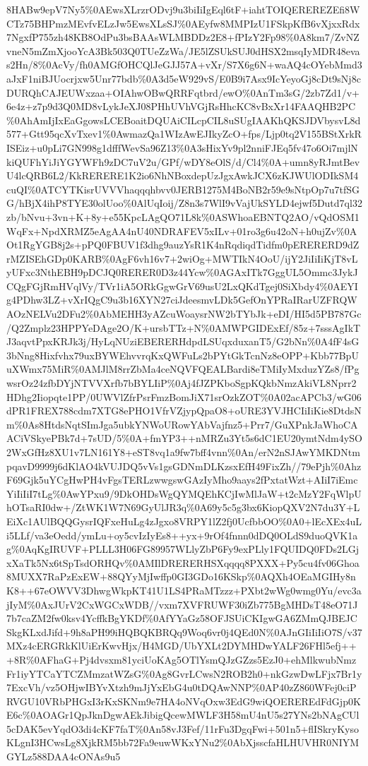 \documentclass[]{article}
\begin{document}
8HABw9epV7Ny5\%0AEwsXLrzrODvj9u3biIiIgEql6tF+iahtTOIQEREREZEfi8WCTz75BHPmzMEvfvELzJw5EwsXLsSJ\%0AEyfw8MMPIzU1FSkpKfB6vXjxxRdx7NgxfP755zh48KB8OdPu3bsBAAsWLMBDDz2E8+fPIzY2Fp98\%0A8km7/ZvNZvneN5mZmXjooYcA3Bk503Q0TUeZzWa/JE5lZSUkSUJ0dHSX2msqIyMDR48evas2Hn/8\%0AcVy/fh0AMGfOHCQlJeGJJ57A+vXr/S7X6g6N+waAQ4cOYebMmd3aJxF1niBJUocrjxw5Unr77bdb\%0A3d5eW929vS/E0B9i7Asx9IcYeyoGj8cDt9sNj8cDURQhCAJEUWxzaa+OIAhwOBwQRRFqtbrd/ewO\%0AnTm3sG/2zb7Zd1/v+6e4z+z7p9d3Q0MD8vLykJeXJ08PHhUVhVGjRsHhcKC8vBxXr14FAAQHB2PC\%0AhAmIjIxEaGgowsLCEBoaitDQUAiCILcpCIL8uSUgIAAKhQKSJDVbysvL8d577+Gtt95qcXvTxev1\%0AwmazQa1WIzAwEJIkyZcO+fps/Ljp0tq2V155BStXrkRISEiz+u0pLi7GN998g1dfffWevSa96Z13\%0A3sHixYv9pl2nniFJEq5fv47o6Oi7mjlNkiQUFhYiJiYGYWFh9zDC7uV2u/GPf/wDY8eOlS/d/Cl4\%0A+umn8yRJmtBevU4lcQRB6L2/KkRERERE1K2io6NhNBoxdepUzJgxAwkJCX6zKJWUlODIkSM4cuQI\%0ATCYTKisrUVVVhaqqqhbvv0JERB1275M4BoNB2r59e9sNtpOp7u7tfSGG/hBjX4ihP8TYE30olUoo\%0AlUqIoij/Z8n3s7WlI9vVajUkSYLD4ejwf5Dutd7ql32zb/bNvu+3vn+K+8y+e55KpcLAgQO71L8k\%0ASWhoaEBNTQ2AO/vQdOSM1WqFx+NpdXRMZ5eAgAA4nU40NDRAFEV5xILv+01ro3g6u42oN+h0ujZv\%0AOt1RgYGB8j2s+pPQ0FBUV1f3dhg9auzYsR1K4nRqdiqdTidfm0pERERERD9dZrMZISEhGDp0KARB\%0AgF6vh16v7+2wiOg+MWTIkN4OoU/ijY2JiIiIiKjT8vLyUFxc3NthEBH9pDCJQ0RERER0D3z44Ycw\%0AGAxITk7GggUL5Ommc3JykJCQgFGjRmHVqlVy/TVr1iA5ORkGgwGrV69usU2LxQKdTgej0SiXbdy4\%0AEYIg4PDhw3LZ+vXrIQgC9u3b16XYN27ciJdeesmvLDk5GefOnYPRaIRarUZFRQWAOzNELVu2DFu2\%0AbMEHH3yAZcuWoaysrNW2bTYbJk+eDI/HI5d5PB787Gc/Q2Zmplz23HPPYeDAge2O/K+ursbTTz+N\%0AMWPGIDExEf/85z+7sssAgIkTJ3aqvtPpxKRJk3j/HyLqNUziEBERERHdpdLSUqxduxanT5/G2bNn\%0A4fF4sG3bNng8Hixfvhx79uxBYWEhvvrqKxQWFuLs2bPYtGkTcnNz8eOPP+Kbb77BpUuXWmx75MiR\%0AMJlM8rrZbMa4ceNQVFQEALBardi8eTMiIyMxduzYZs8/fPgwsrOz24zfbDYjNTVVXrfb7bBYLIiP\%0Aj4fJZPKboSgpKQkbNmzAkiVL8Nprr2HDhg2Iiopqte1PP/0UWVlZfrPsrFmzBomJiX71srOzkZOT\%0A02acAPCb3/wG06dPR1FREX788cdm7XTG8ePHO1VfrVZjypQpaO8+oURE3YVJHCIiIiKie8DtdsNm\%0As8HtdsNqtSImJga5ubkYNWoURowYAbVajfnz5+Prr7/GuXPnkJaWhoCAACiVSkyePBk7d+7sUD/5\%0A+fmYP3++nMRZu3Yt5s6dC1EU20ymtNdm4ySO2WxGfHz8XU1v7LN161Y8+eST8vq1a9fw7bff4vnn\%0An/erN2nSJAwYMKDNtmpqavD9999j6dKlAO4kVUJDQ5vVs1gsGDNmDLKzsxEfH49FixZh//79ePjh\%0AhzF69Gjk5uYCgHwPH4vFgsTERLzwwgswGAzIyMho9aays2fPxtatWzt+AIiI7iEmcYiIiIiI7tLg\%0AwYPxu9/9DkOHDsWgQYMQEhKCjIwMlJaW+t2cMzY2FqWlpUhOTsaRI0dw+/ZtWK1W7N69GyUlJR3q\%0A69y5c5g3bx6KiopQXV2N7du3Y+LEiXc1AUlBQQGysrIQFxeHuLg4zJgxo8VRPY1lZ2fj0UcfbbOO\%0A0+lEcXEx4uLi5LLf/va3eOedd/ymLu+oy5cvIzIyEs8++yx+9rOf4fnnn0dDQ0OLdS9duoQVK1ag\%0AqKgIRUVF+PLLL3H06FG89957WLlyZbP6Fy9exPLly1FQUIDQ0FDs2LGjxXaTk5Nx6tSpTsdORHQv\%0AMIlDRERERHSXqqqq8PXXX+Py5cu4fv06Ghoa8MUXX7RaPzExEW+88QYyMjIwffp0GI3GDo16KSkp\%0AQXh4OEaMGIHy8nK8++67eOWVV3DhwgWkpKT41U1LS4PRaMTzzz+PXbt2wWg0wmg0Yu/evc3ajIyM\%0AxJUrV2CxWGCxWDB//vxm7XVFRUWF30iZb775BgMHDsT48eO71J7b7caZM2fw0ksv4YcffkBgYKDf\%0AfYYaGz58OFJSUiCKIgwGA6ZMmQJBEJCSkgKLxdJifd+9h8aPH99iHQBQKBRQq9Woq6vr0j4QEd0N\%0AJnGIiIiIiO7S/v37MXz4cERGRkKlUiErKwvHjx/H4MGD/UbYXLt2DYMHDwYALF26FHl5efj+++8R\%0AFhaG+Pj4dvsxm81yciUoKAg5OTlYsmQJzGZzs5EzJ0+ehMlkwubNmzFr1iyYTCaYTCZMmzatWZsG\%0Ag8GvrLCwsN2ROB2h0+nkGzwDwLFjx7Br1y7ExcVh/vz5OHjwIBYvXtzh9mJjYxEbG4u0tDQAwNNP\%0AP40zZ860WFej0ciPRVGU10VRbPHGxI3rKxSKNm9e7HA4oNVqOxw3EdG9wiQOEREREdFdGjp0KE6c\%0AOAGr1QpJknDgwAEkJibigQcewMWLF3H58mU4nU5s27YNs2bNAgCUl5cDAK5evYqdO3di4cKF7faT\%0An58vJ3Fef/11rFu3DgqFwi+501n5+flISkryKysoKLgnI3HCwsLg8XjkRM5bb72Fa9euwWKxYNu2\%0AbXjsscfaHLHUVHR0NIYMGYLz588DAA4cONAs9u5
\end{document}
